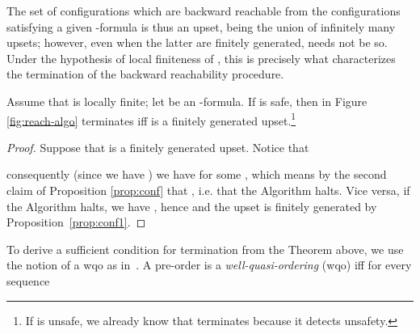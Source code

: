 \documentclass{LMCS}
\theoremstyle{plain}\newtheorem{assumption}[thm]{Assumption}
\theoremstyle{plain}\newtheorem{proposition}[thm]{Proposition}
\theoremstyle{plain}\newtheorem{property}[thm]{Property}
\theoremstyle{plain}\newtheorem{example}[thm]{Example}
\theoremstyle{plain}\newtheorem{claim}[thm]{Claim}
\theoremstyle{plain}\newtheorem{lemma}[thm]{Lemma}
\begin{document}
The set  of configurations which are backward reachable
from the configurations satisfying a given -formula  is
thus an upset, being the union of infinitely many upsets; however,
even when the latter are finitely generated,  needs not
be so.  Under the hypothesis of local finiteness of , this is
precisely what characterizes the termination of the backward
reachability procedure.
\begin{thm}
  \label{thm:term}
  Assume that  is locally finite; let  be an
  -formula. If  is safe, then  in
  Figure \ref{fig:reach-algo} terminates iff  is a
  finitely generated upset.\footnote{If  is unsafe, we already know
    that  terminates because it detects unsafety.}
\end{thm}
\begin{proof}
  Suppose that  is a finitely generated upset. Notice
  that
  
  consequently (since we have ) we have  for some , which means by
  the second claim of Proposition \ref{prop:conf} that , i.e. that the
  Algorithm halts. Vice versa, if the Algorithm halts, we have
  , hence
   and the upset  is finitely generated by
  Proposition~\ref{prop:conf1}.
\end{proof}
To derive a sufficient condition for termination from the Theorem
above, we use the notion of a wqo as in~\cite{lics}.  A pre-order  is a \emph{well-quasi-ordering} (wqo) iff for every sequence
\end{document}
